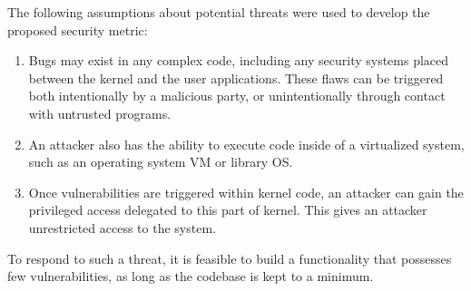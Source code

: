 The following assumptions about potential threats were used to develop the proposed
 security metric:

\begin{enumerate}
\item  Bugs may exist in any complex code, including any security systems
placed between the kernel and the user applications. These flaws can be triggered
both intentionally by a malicious party, or unintentionally through contact with
untrusted programs.

\item An attacker also has the ability to execute code inside
of a virtualized system, such as an operating system VM or library OS.

\item Once vulnerabilities are triggered within kernel code, an attacker can gain the
privileged access delegated to this part of kernel. This gives an attacker unrestricted
access to the system.

\end{enumerate}

To respond to such a threat, it is feasible to build a functionality that
possesses few vulnerabilities, as long as the codebase is kept to a minimum.

